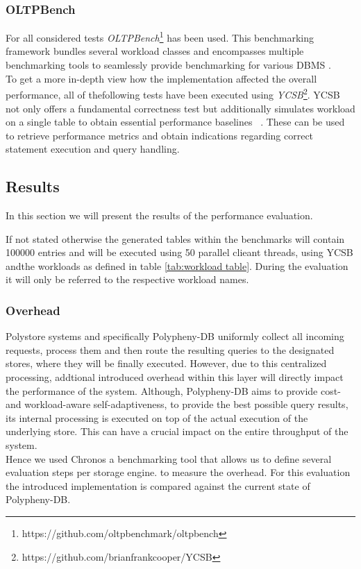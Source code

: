\subsubsection{OLTPBench}

For all considered tests \textit{OLTPBench}\footnote{https://github.com/oltpbenchmark/oltpbench} 
has been used. This benchmarking framework bundles several workload classes and 
encompasses multiple benchmarking tools to seamlessly provide benchmarking for various DBMS \cite{oltp_2013}.\\

To get a more in-depth view how the implementation affected the overall performance, all of thefollowing tests have been executed 
using \textit{YCSB}\footnote{https://github.com/brianfrankcooper/YCSB}.
YCSB not only offers a fundamental correctness test but additionally simulates workload on a single table to obtain essential performance baselines ~\cite{ycsb_2010}.
These can be used to retrieve performance metrics and obtain indications regarding correct statement execution and query handling.\\



\subsection{Results}
\label{sec:results}
In this section we will present the results of the performance evaluation.

If not stated otherwise the generated tables within the benchmarks will contain 100000 entries and will be executed using
50 parallel clieant threads, using YCSB andthe workloads as defined in table \ref{tab:workload table}.
During the evaluation it will only be referred to the respective workload names.




\subsubsection{Overhead} 
Polystore systems and specifically Polypheny-DB uniformly collect all incoming requests, process them and then
route the resulting queries to the designated stores, where they will be finally executed. 
However, due to this centralized processing, addtional introduced overhead within this layer will directly impact the performance of the system.
Although, Polypheny-DB aims to provide cost- and workload-aware self-adaptiveness, to provide the best possible query results,
its internal processing is executed on top of the actual execution of the underlying store.
This can have a crucial impact on the entire throughput of the system.\\
Hence we used Chronos  a benchmarking tool that allows us to define several evaluation steps per storage engine.
to measure the overhead. For this evaluation the introduced implementation is compared against the current state of Polypheny-DB.\\

